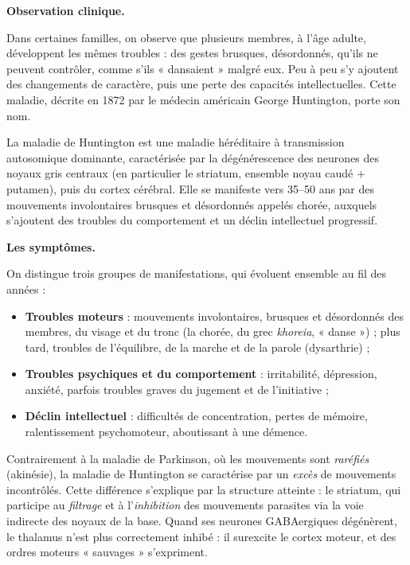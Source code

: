 \documentclass[11pt]{article}
\newcommand{\cle}[1]{{\popxbold\color{popdark}#1}}
\begin{document}
\textbf{Observation clinique.}\par

Dans certaines familles, on observe que plusieurs membres, à l'âge adulte, développent les mêmes troubles : des gestes brusques, désordonnés, qu'ils ne peuvent contrôler, comme s'ils « dansaient » malgré eux. Peu à peu s'y ajoutent des changements de caractère, puis une perte des capacités intellectuelles. Cette maladie, décrite en 1872 par le médecin américain George Huntington, porte son nom.

\begin{definition}
La \cle{maladie de Huntington} est une \cle{maladie héréditaire} à transmission \cle{autosomique dominante}, caractérisée par la \cle{dégénérescence} des neurones des \cle{noyaux gris centraux} (en particulier le \cle{striatum}, ensemble noyau caudé + putamen), puis du cortex cérébral. Elle se manifeste vers 35--50 ans par des \cle{mouvements involontaires} brusques et désordonnés appelés \cle{chorée}, auxquels s'ajoutent des troubles du comportement et un déclin intellectuel progressif.
\end{definition}

\textbf{Les symptômes.}\par

On distingue trois groupes de manifestations, qui évoluent ensemble au fil des années :
\begin{itemize}
\item \textbf{Troubles moteurs} : mouvements involontaires, brusques et désordonnés des membres, du visage et du tronc (la \cle{chorée}, du grec \emph{khoreia}, « danse ») ; plus tard, troubles de l'équilibre, de la marche et de la parole (dysarthrie) ;
\item \textbf{Troubles psychiques et du comportement} : irritabilité, dépression, anxiété, parfois troubles graves du jugement et de l'initiative ;
\item \textbf{Déclin intellectuel} : difficultés de concentration, pertes de mémoire, ralentissement psychomoteur, aboutissant à une démence.
\end{itemize}

Contrairement à la maladie de Parkinson, où les mouvements sont \emph{raréfiés} (akinésie), la maladie de Huntington se caractérise par un \emph{excès} de mouvements incontrôlés. Cette différence s'explique par la structure atteinte : le \cle{striatum}, qui participe au \emph{filtrage} et à l'\emph{inhibition} des mouvements parasites via la voie indirecte des noyaux de la base. Quand ses neurones GABAergiques dégénèrent, le thalamus n'est plus correctement inhibé : il surexcite le cortex moteur, et des ordres moteurs « sauvages » s'expriment.
\end{document}
